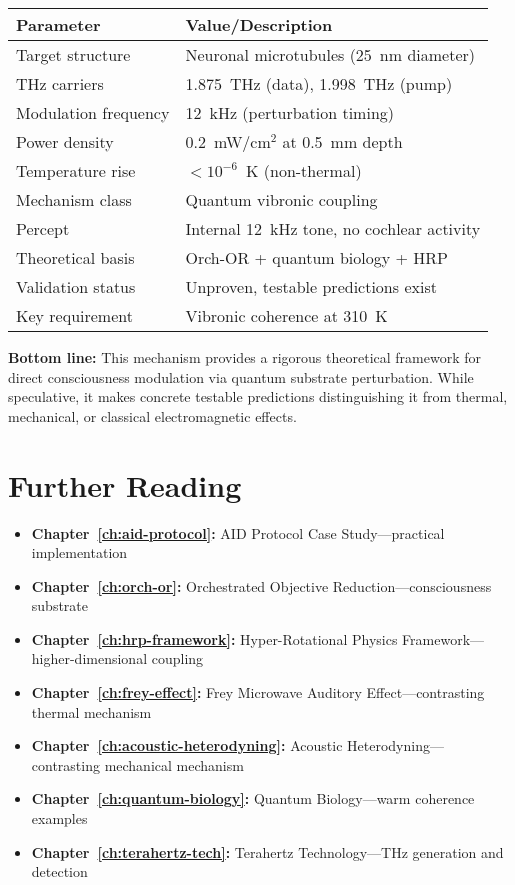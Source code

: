 \begin{center}
\begin{tabular}{@{}ll@{}}
\toprule
\textbf{Parameter} & \textbf{Value/Description} \\
\midrule
Target structure & Neuronal microtubules (25~nm diameter) \\
THz carriers & 1.875~THz (data), 1.998~THz (pump) \\
Modulation frequency & 12~kHz (perturbation timing) \\
Power density & 0.2~mW/cm$^2$ at 0.5~mm depth \\
Temperature rise & $<10^{-6}$~K (non-thermal) \\
Mechanism class & Quantum vibronic coupling \\
Percept & Internal 12~kHz tone, no cochlear activity \\
Theoretical basis & Orch-OR + quantum biology + HRP \\
Validation status & Unproven, testable predictions exist \\
Key requirement & Vibronic coherence at 310~K \\
\bottomrule
\end{tabular}
\end{center}

\textbf{Bottom line:} This mechanism provides a rigorous theoretical framework for direct consciousness modulation via quantum substrate perturbation. While speculative, it makes concrete testable predictions distinguishing it from thermal, mechanical, or classical electromagnetic effects.

\section{Further Reading}

\begin{itemize}
\item \textbf{Chapter~\ref{ch:aid-protocol}:} AID Protocol Case Study---practical implementation
\item \textbf{Chapter~\ref{ch:orch-or}:} Orchestrated Objective Reduction---consciousness substrate
\item \textbf{Chapter~\ref{ch:hrp-framework}:} Hyper-Rotational Physics Framework---higher-dimensional coupling
\item \textbf{Chapter~\ref{ch:frey-effect}:} Frey Microwave Auditory Effect---contrasting thermal mechanism
\item \textbf{Chapter~\ref{ch:acoustic-heterodyning}:} Acoustic Heterodyning---contrasting mechanical mechanism
\item \textbf{Chapter~\ref{ch:quantum-biology}:} Quantum Biology---warm coherence examples
\item \textbf{Chapter~\ref{ch:terahertz-tech}:} Terahertz Technology---THz generation and detection
\end{itemize}

